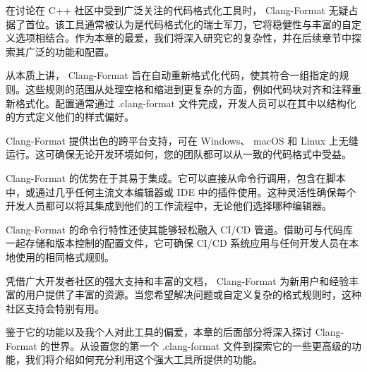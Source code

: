 
在讨论在 C++ 社区中受到广泛关注的代码格式化工具时， Clang-Format 无疑占据了首位。该工具通常被认为是代码格式化的瑞士军刀，它将稳健性与丰富的自定义选项相结合。作为本章的最爱，我们将深入研究它的复杂性，并在后续章节中探索其广泛的功能和配置。

从本质上讲， Clang-Format 旨在自动重新格式化代码，使其符合一组指定的规则。这些规则的范围从处理空格和缩进到更复杂的方面，例如代码块对齐和注释重新格式化。配置通常通过 .clang-format 文件完成，开发人员可以在其中以结构化的方式定义他们的样式偏好。

Clang-Format 提供出色的跨平台支持，可在 Windows、 macOS 和 Linux 上无缝运行。这可确保无论开发环境如何，您的团队都可以从一致的代码格式中受益。

Clang-Format 的优势在于其易于集成。它可以直接从命令行调用，包含在脚本中，或通过几乎任何主流文本编辑器或 IDE 中的插件使用。这种灵活性确保每个开发人员都可以将其集成到他们的工作流程中，无论他们选择哪种编辑器。

Clang-Format 的命令行特性还使其能够轻松融入 CI/CD 管道。借助可与代码库一起存储和版本控制的配置文件，它可确保 CI/CD 系统应用与任何开发人员在本地使用的相同格式规则。

凭借广大开发者社区的强大支持和丰富的文档， Clang-Format 为新用户和经验丰富的用户提供了丰富的资源。当您希望解决问题或自定义复杂的格式规则时，这种社区支持会特别有用。

鉴于它的功能以及我个人对此工具的偏爱，本章的后面部分将深入探讨 Clang-Format 的世界。从设置您的第一个 .clang-format 文件到探索它的一些更高级的功能，我们将介绍如何充分利用这个强大工具所提供的功能。


















